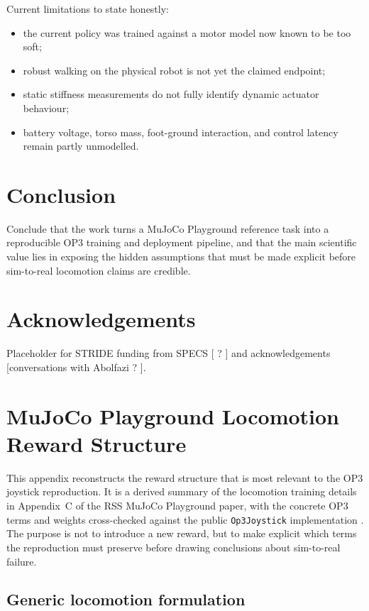 Current limitations to state honestly:
\begin{itemize}
  \item the current policy was trained against a motor model now known to be too soft;
  \item robust walking on the physical robot is not yet the claimed endpoint;
  \item static stiffness measurements do not fully identify dynamic actuator behaviour;
  \item battery voltage, torso mass, foot-ground interaction, and control latency remain partly unmodelled.
\end{itemize}

\section{Conclusion}
\label{sec:conclusion}

Conclude that the work turns a MuJoCo Playground reference task into a reproducible OP3 training and deployment pipeline, and that the main scientific value lies in exposing the hidden assumptions that must be made explicit before sim-to-real locomotion claims are credible.

\section*{Acknowledgements}

Placeholder for STRIDE funding from SPECS [ ? ] and acknowledgements [conversations with Abolfazi ? ].

\appendix

\section{MuJoCo Playground Locomotion Reward Structure}
\label{app:playground-rewards}

This appendix reconstructs the reward structure that is most relevant to the OP3 joystick reproduction. It is a derived summary of the locomotion training details in Appendix~C of the RSS MuJoCo Playground paper, with the concrete OP3 terms and weights cross-checked against the public \texttt{Op3Joystick} implementation \citep{Zakka2025-demonstrating-mujoco-playground,GoogleDeepMind2025-mujoco-playground}. The purpose is not to introduce a new reward, but to make explicit which terms the reproduction must preserve before drawing conclusions about sim-to-real failure.

\subsection{Generic locomotion formulation}

